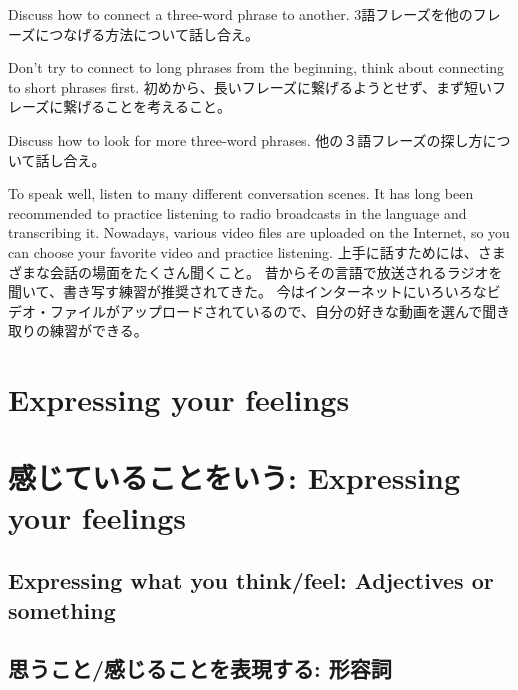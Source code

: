 \documentclass[uplatex,dvipdfmx,b5paper,english,10pt]{jsbook}
\begin{document}
\begin{toiquestion}
\ifEnglish
Discuss how to connect a three-word phrase to another.
\else
3語フレーズを他のフレーズにつなげる方法について話し合え。
\fi
\end{toiquestion}
\begin{toianswer}
\ifEnglish
Don't try to connect to long phrases from the beginning, think about connecting to short phrases first.
\else
初めから、長いフレーズに繋げるようとせず、まず短いフレーズに繋げることを考えること。
\fi
\end{toianswer}

\begin{toiquestion}
\ifEnglish
Discuss how to look for more three-word phrases.
\else
他の３語フレーズの探し方について話し合え。
\fi
\end{toiquestion}
\begin{toianswer}
\ifEnglish
To speak well, listen to many different conversation scenes.
It has long been recommended to practice listening to radio broadcasts in the language and transcribing it.
Nowadays, various video files are uploaded on the Internet, so you can choose your favorite video and practice listening.
\else
上手に話すためには、さまざまな会話の場面をたくさん聞くこと。
昔からその言語で放送されるラジオを聞いて、書き写す練習が推奨されてきた。
今はインターネットにいろいろなビデオ・ファイルがアップロードされているので、自分の好きな動画を選んで聞き取りの練習ができる。
\fi
\end{toianswer}


%

\ifEnglish
\section{Expressing your feelings}
\else
\section{感じていることをいう: Expressing your feelings}
\fi


\ifEnglish
\subsection{Expressing what you think/feel: Adjectives or something}
\else
\subsection{思うこと/感じることを表現する: 形容詞}
\fi
\end{document}

